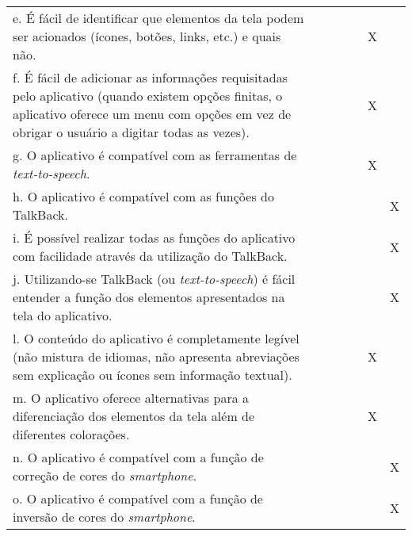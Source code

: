 \documentclass[portuguese,oneside]{tcc}
\begin{document}
\begin{center}
\begin{longtabu}{|L{25em}|c|c|c|c|c|c|}
e. É fácil de identificar que elementos da tela podem ser acionados (ícones, botões, links, etc.) e quais não. & & & & & X & \\ 
f. É fácil de adicionar as informações requisitadas pelo aplicativo (quando existem opções finitas, o aplicativo oferece um menu com opções em vez de obrigar o usuário a digitar todas as vezes). & & & & & X & \\ 
g. O aplicativo é compatível com as ferramentas de \emph{text-to-speech}. & & & & & X & \\ 
h. O aplicativo é compatível com as funções do TalkBack. & & & & & & X \\ 
i. É possível realizar todas as funções do aplicativo com facilidade através da utilização do TalkBack.	& & & & & & X \\ 
j. Utilizando-se TalkBack (ou \emph{text-to-speech}) é fácil entender a função dos elementos apresentados na tela do aplicativo. & & & & & & X \\ 
l. O conteúdo do aplicativo é completamente legível (não mistura de idiomas, não apresenta abreviações sem explicação ou ícones sem informação textual). & & & & & X & \\ 
m. O aplicativo oferece alternativas para a diferenciação dos elementos da tela além de diferentes colorações. & & & & & X & \\ 
n. O aplicativo é compatível com a função de correção de cores do \emph{smartphone}. & & & & & & X \\ 
o. O aplicativo é compatível com a função de inversão de cores do \emph{smartphone}. & & & & & & X \\ 
\end{longtabu}
\end{center}
\end{document}
